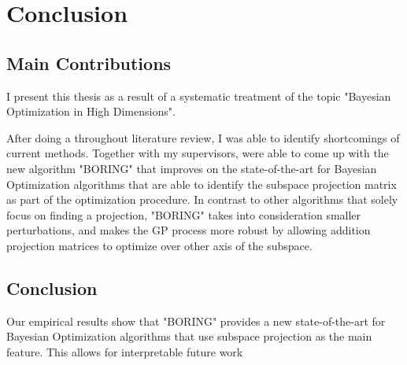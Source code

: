 \chapter{Conclusion}

\ifpdf
    \graphicspath{{Chapter7/Figs/Raster/}{Chapter7/Figs/PDF/}{Chapter7/Figs/}}
\else
    \graphicspath{{Chapter7/Figs/Vector/}{Chapter7/Figs/}}
\fi

\section{Main Contributions}
I present this thesis as a result of a systematic treatment of the topic "Bayesian Optimization in High Dimensions".

After doing a throughout literature review, I was able to identify shortcomings of current methods.
Together with my supervisors, were able to come up with the new algorithm "BORING" that improves on the state-of-the-art for Bayesian Optimization algorithms that are able to identify the subspace projection matrix as part of the optimization procedure.
In contrast to other algorithms that solely focus on finding a projection, "BORING" takes into consideration smaller perturbations, and makes the GP process more robust by allowing addition projection matrices to optimize over other axis of the subspace. \\

\section{Conclusion}

Our empirical results show that "BORING" provides a new state-of-the-art for Bayesian Optimization algorithms that use subspace projection as the main feature.
This allows for interpretable future work
 



